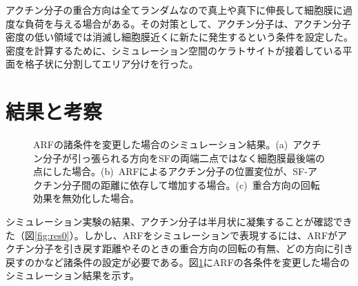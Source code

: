\documentclass[10pt,twocolumn,a4j]{jarticle}
\begin{document}
アクチン分子の重合方向は全てランダムなので真上や真下に伸長して細胞膜に過度な負荷を与える場合がある。その対策として、アクチン分子は、アクチン分子密度の低い領域では消滅し細胞膜近くに新たに発生するという条件を設定した。密度を計算するために、シミュレーション空間のケラトサイトが接着している平面を格子状に分割してエリア分けを行った。
\section{結果と考察}
\begin{figure}[tbp]
\centering
  \caption{ARFの諸条件を変更した場合のシミュレーション結果。(a)~アクチン分子が引っ張られる方向をSFの両端二点ではなく細胞膜最後端の点にした場合。(b)~ARFによるアクチン分子の位置変位が、SF-アクチン分子間の距離に依存して増加する場合。(c)~重合方向の回転効果を無効化した場合。}
 \label{fig:res1}
\end{figure}
シミュレーション実験の結果、アクチン分子は半月状に凝集することが確認できた（図\ref{fig:res0}）。しかし、ARFをシミュレーションで表現するには、ARFがアクチン分子を引き戻す距離やそのときの重合方向の回転の有無、どの方向に引き戻すのかなど諸条件の設定が必要である。図\ref{fig:res1}にARFの各条件を変更した場合のシミュレーション結果を示す。
\end{document}
